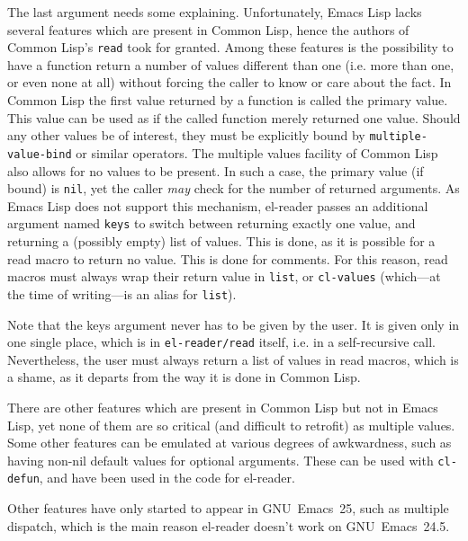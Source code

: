 \documentclass[a4paper,10pt,twoside]{article}
\newcommand{\el}{Emacs Lisp}
\newcommand{\cl}{Common Lisp}
\newcommand{\elr}{el-reader}
\newcommand{\sym}[1]{\texttt{#1}}
\newcommand{\fun}[1]{\texttt{#1}}
\newcommand{\emacsv}[1]{GNU~Emacs~#1}
\newcommand{\Read}{\fun{read}}
\begin{document}
The last argument needs some explaining.  Unfortunately, \el{} lacks several
features which are present in \cl{}, hence the authors of \cl{}’s \Read{} took
for granted.  Among these features is the possibility to have a function return
a number of values different than one (i.e. more than one, or even none at all)
without forcing the caller to know or care about the fact.  In \cl{} the first
value returned by a function is called the primary value.  This value can be
used as if the called function merely returned one value.  Should any other
values be of interest, they must be explicitly bound by
\sym{multiple-value-bind} or similar operators.  The multiple values facility of
\cl{} also allows for no values to be present.  In such a case, the primary
value (if bound) is \sym{nil}, yet the caller \emph{may} check for the number of
returned arguments.  As \el{} does not support this mechanism, \elr{} passes an
additional argument named \sym{keys} to switch between returning exactly one
value, and returning a (possibly empty) list of values.  This is done, as it is
possible for a read macro to return no value.  This is done for comments.  For
this reason, read macros must always wrap their return value in \fun{list}, or
\fun{cl-values} (which---at the time of writing---is an alias for \fun{list}).

Note that the keys argument never has to be given by the user.  It is given only
in one single place, which is in \fun{el-reader/read} itself, i.e. in a
self-recursive call.  Nevertheless, the user must always return a list of values
in read macros, which is a shame, as it departs from the way it is done in
\cl{}.

There are other features which are present in \cl{} but not in \el{}, yet none
of them are so critical (and difficult to retrofit) as multiple values.  Some
other features can be emulated at various degrees of awkwardness, such as having
non-nil default values for optional arguments.  These can be used with
\fun{cl-defun}, and have been used in the code for \elr{}.

Other features have only started to appear in \emacsv{25}, such as multiple
dispatch, which is the main reason \elr{} doesn’t work on \emacsv{24.5}.

\end{document}
